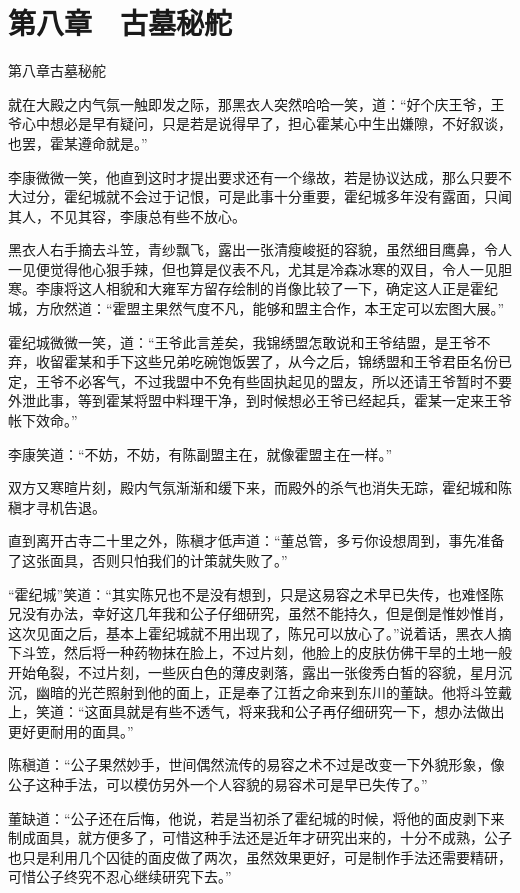 \chapter{第八章　古墓秘舵}

第八章古墓秘舵

就在大殿之内气氛一触即发之际，那黑衣人突然哈哈一笑，道：“好个庆王爷，王爷心中想必是早有疑问，只是若是说得早了，担心霍某心中生出嫌隙，不好叙谈，也罢，霍某遵命就是。”

李康微微一笑，他直到这时才提出要求还有一个缘故，若是协议达成，那么只要不大过分，霍纪城就不会过于记恨，可是此事十分重要，霍纪城多年没有露面，只闻其人，不见其容，李康总有些不放心。

黑衣人右手摘去斗笠，青纱飘飞，露出一张清瘦峻挺的容貌，虽然细目鹰鼻，令人一见便觉得他心狠手辣，但也算是仪表不凡，尤其是冷森冰寒的双目，令人一见胆寒。李康将这人相貌和大雍军方留存绘制的肖像比较了一下，确定这人正是霍纪城，方欣然道：“霍盟主果然气度不凡，能够和盟主合作，本王定可以宏图大展。”

霍纪城微微一笑，道：“王爷此言差矣，我锦绣盟怎敢说和王爷结盟，是王爷不弃，收留霍某和手下这些兄弟吃碗饱饭罢了，从今之后，锦绣盟和王爷君臣名份已定，王爷不必客气，不过我盟中不免有些固执起见的盟友，所以还请王爷暂时不要外泄此事，等到霍某将盟中料理干净，到时候想必王爷已经起兵，霍某一定来王爷帐下效命。”

李康笑道：“不妨，不妨，有陈副盟主在，就像霍盟主在一样。”

双方又寒暄片刻，殿内气氛渐渐和缓下来，而殿外的杀气也消失无踪，霍纪城和陈稹才寻机告退。

直到离开古寺二十里之外，陈稹才低声道：“董总管，多亏你设想周到，事先准备了这张面具，否则只怕我们的计策就失败了。”

“霍纪城”笑道：“其实陈兄也不是没有想到，只是这易容之术早已失传，也难怪陈兄没有办法，幸好这几年我和公子仔细研究，虽然不能持久，但是倒是惟妙惟肖，这次见面之后，基本上霍纪城就不用出现了，陈兄可以放心了。”说着话，黑衣人摘下斗笠，然后将一种药物抹在脸上，不过片刻，他脸上的皮肤仿佛干旱的土地一般开始龟裂，不过片刻，一些灰白色的薄皮剥落，露出一张俊秀白皙的容貌，星月沉沉，幽暗的光芒照射到他的面上，正是奉了江哲之命来到东川的董缺。他将斗笠戴上，笑道：“这面具就是有些不透气，将来我和公子再仔细研究一下，想办法做出更好更耐用的面具。”

陈稹道：“公子果然妙手，世间偶然流传的易容之术不过是改变一下外貌形象，像公子这种手法，可以模仿另外一个人容貌的易容术可是早已失传了。”

董缺道：“公子还在后悔，他说，若是当初杀了霍纪城的时候，将他的面皮剥下来制成面具，就方便多了，可惜这种手法还是近年才研究出来的，十分不成熟，公子也只是利用几个囚徒的面皮做了两次，虽然效果更好，可是制作手法还需要精研，可惜公子终究不忍心继续研究下去。”


